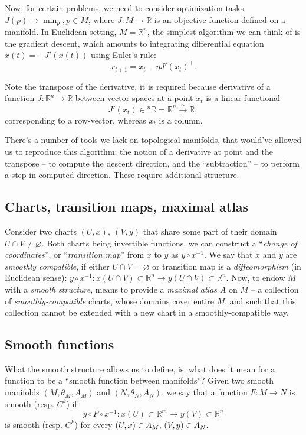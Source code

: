 Now, for certain problems, we need to consider optimization tasks \(
J(p)\to\min_p, p\in M \), where \( J: M\to \mathbb{R} \) is an objective
function defined on a manifold. In Euclidean setting, \( M = \mathbb{R}^n \),
the simplest algorithm we can think of is the gradient descent,
which amounts to integrating differential equation \( \dot x (t) = -J'(x(t)) \)
using Euler's rule:
\[
x_{t+1} = x_t - \eta J'(x_t)^\top. \]

Note the transpose of the derivative, it is required because derivative of a
function \( J: \mathbb{R}^n\to\mathbb{R} \) between vector spaces at a point \(
x_t \) is a linear functional \[ J'(x_t) \in {^n}\mathbb{R} =
\mathbb{R}^n\xrightarrow{\sim}\mathbb{R}, \] corresponding to a row-vector, whereas \( x_t \)
is a column.

There's a number of tools we lack on topological manifolds, that would've
allowed us to reproduce this algorithm: the notion of a derivative at point and
the transpose -- to compute the descent direction, and the ``subtraction'' --
to perform a step in computed direction. These require additional structure.

\subsection*{Charts, transition maps, maximal atlas}

Consider two charts \( (U, x),~ (V, y) \) that share some part of their domain
\( U\cap V \neq \varnothing. \)
Both charts being invertible functions,
we can construct a ``\emph{change of coordinates}'', or ``\emph{transition map}''
from \(x\) to \(y\) as \(y\circ x^{-1}\). We say that \(x\) and \(y\)
are \emph{smoothly compatible}, if either \(U\cap V = \varnothing\)
or transition map is a \emph{diffeomorphism} (in Euclidean sense):
\(y\circ x^{-1}: x(U\cap V)\subset\mathbb{R}^n
\to y(U\cap V)\subset\mathbb{R}^n.\)
Now, to endow \(M\) with a \emph{smooth structure}, means to provide
a \emph{maximal atlas} \(A\) on \(M\) -- a collection of \emph{smoothly-compatible}
charts, whose domains cover entire \(M\), and such that
this collection cannot be extended with a new chart in a smoothly-compatible way.

\subsection*{Smooth functions}
What the smooth structure allows us to define, is: what does it mean for a
function to be a ``smooth function between manifolds''?
Given two smooth manifolds \((M, \theta_M, A_M)\)
and \((N, \theta_N, A_N)\), we say that a function \(F: M\to N\)
is smooth (resp. \(C^k\)) if
\[y\circ F\circ x^{-1}: x(U)\subset\mathbb{R}^m \to y(V)\subset\mathbb{R}^n\]
is smooth (resp. \(C^k\))
for every \((U, x)\in A_M$, $(V, y) \in A_N.\)

